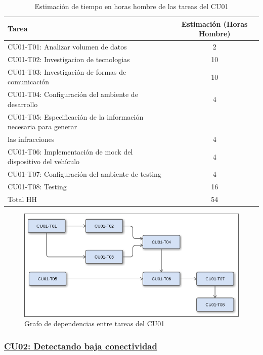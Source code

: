\begin{table}[htb]
\begin{center}
\begin{tabular}{|l|c|}
\hline
Tarea & Estimación (Horas Hombre) \\
\hline \hline
CU01-T01: Analizar volumen de datos & 2 \\ \hline
CU01-T02: Investigacion de tecnologias & 10 \\ \hline
CU01-T03: Investigación de formas de comunicación & 10 \\ \hline
CU01-T04: Configuración del ambiente de desarrollo & 4 \\ \hline
CU01-T05: Especificación de la información necesaria para generar \\ las infracciones & 4 \\ \hline
CU01-T06: Implementación de mock del dispositivo del vehículo & 4 \\ \hline
CU01-T07: Configuración del ambiente de testing & 4 \\ \hline
CU01-T08: Testing & 16 \\ \hline \hline
Total HH & 54 \\ \hline
\end{tabular}
\caption{Estimación de tiempo en horas hombre de las tareas del CU01}
\end{center}
\end{table}


\begin{figure}
  \centering
    \includegraphics[width=1\textwidth]{./imagenes/dependenciasCU01.png}
  \caption{Grafo de dependencias entre tareas del CU01}
\end{figure}


\subsubsection{\underline{CU02: Detectando baja conectividad}}

